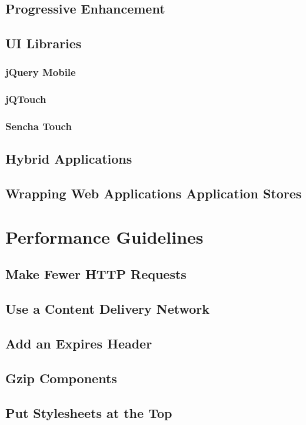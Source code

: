 \subsection{Progressive Enhancement}

\subsection{UI Libraries}
\subsubsection{jQuery Mobile}
\subsubsection{jQTouch}
\subsubsection{Sencha Touch}

\subsection{Hybrid Applications}
\subsection{Wrapping Web Applications Application Stores}

\section{Performance Guidelines}
\label{section:performance-guidelines}

\subsection{Make Fewer HTTP Requests}
\subsection{Use a Content Delivery Network}
\subsection{Add an Expires Header}
\subsection{Gzip Components}
\subsection{Put Stylesheets at the Top}
